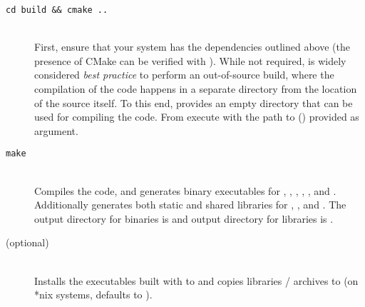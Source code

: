 \documentclass[11pt]{article}
\begin{document}
\begin{description}
	\item[{\tt cd build \&\& cmake ..}] \hfill \\
	First, ensure that your system has the dependencies outlined above (the presence of CMake can be verified with ). While not required, is widely considered {\em best practice} to perform an out-of-source build, where the compilation of the code happens in a separate directory from the location of the source itself. To this end, \hermes provides an empty  directory that can be used for compiling the code. From  execute  with the path to  () provided as argument.
	\item[{\tt make}] \hfill \\
	Compiles the code, and generates binary executables for \fft, \rnamfpt, \rnaeq, \fftmfpt, \ffteq, and \rateeq. Additionally generates both static and shared libraries for \fft, \rnamfpt, and \rnaeq. The output directory for binaries is  and output directory for libraries is .
	\item[ \textnormal{(optional)}] \hfill \\
	Installs the executables built with  to  and copies libraries / archives to  (on *nix systems,  defaults to ).
\end{description}

\end{document}

